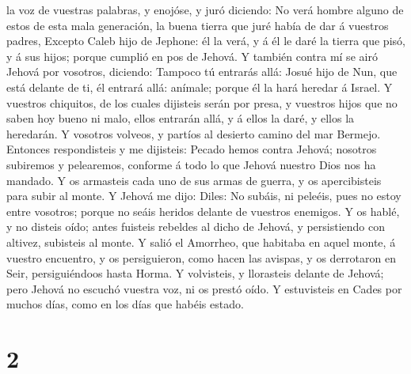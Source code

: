 la voz de vuestras palabras, y enojóse, y juró diciendo: 
No verá hombre alguno de estos de esta mala generación, la buena tierra
que juré había de dar á vuestros padres,  Excepto Caleb
hijo de Jephone: él la verá, y á él le daré la tierra que pisó, y á sus
hijos; porque cumplió en pos de Jehová.  Y también contra
mí se airó Jehová por vosotros, diciendo: Tampoco tú entrarás allá:
 Josué hijo de Nun, que está delante de ti, él entrará
allá: anímale; porque él la hará heredar á Israel.  Y
vuestros chiquitos, de los cuales dijisteis serán por presa, y vuestros
hijos que no saben hoy bueno ni malo, ellos entrarán allá, y á ellos la
daré, y ellos la heredarán.  Y vosotros volveos, y
partíos al desierto camino del mar Bermejo.  Entonces
respondisteis y me dijisteis: Pecado hemos contra Jehová; nosotros
subiremos y pelearemos, conforme á todo lo que Jehová nuestro Dios nos
ha mandado. Y os armasteis cada uno de sus armas de guerra, y os
apercibisteis para subir al monte.  Y Jehová me dijo:
Diles: No subáis, ni peleéis, pues no estoy entre vosotros; porque no
seáis heridos delante de vuestros enemigos.  Y os hablé,
y no disteis oído; antes fuisteis rebeldes al dicho de Jehová, y
persistiendo con altivez, subisteis al monte.  Y salió el
Amorrheo, que habitaba en aquel monte, á vuestro encuentro, y os
persiguieron, como hacen las avispas, y os derrotaron en Seir,
persiguiéndoos hasta Horma.  Y volvisteis, y llorasteis
delante de Jehová; pero Jehová no escuchó vuestra voz, ni os prestó
oído.  Y estuvisteis en Cades por muchos días, como en
los días que habéis estado.

\hypertarget{section-1}{%
\section{2}\label{section-1}}

